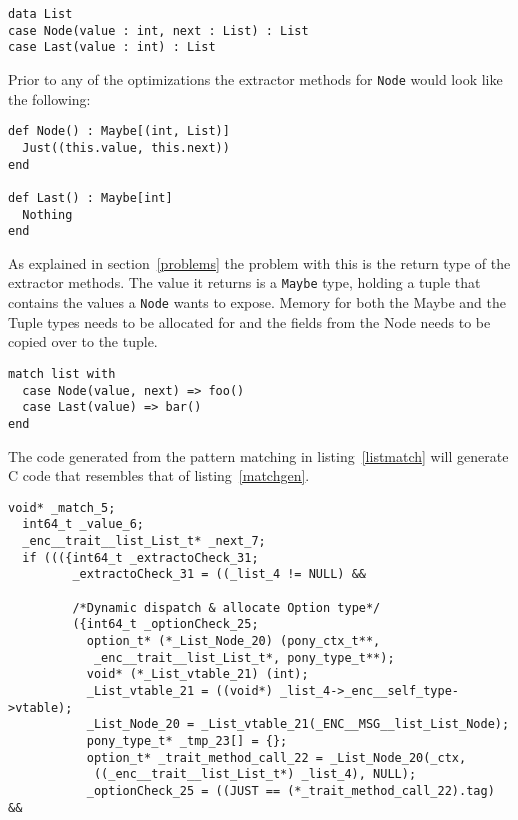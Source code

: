 \documentclass[10pt]{report}
\def\code#1{\texttt{#1}} %
\begin{document}
{\begin{lstlisting}[language=encore]
data List
case Node(value : int, next : List) : List
case Last(value : int) : List
\end{lstlisting}

\par{Prior to any of the optimizations the extractor methods for \code{Node} would look like the following:}

\begin{lstlisting}[language=encore,caption={Extractor methods before optimization}]
def Node() : Maybe[(int, List)]
  Just((this.value, this.next))
end

def Last() : Maybe[int]
  Nothing
end
\end{lstlisting}

\par{As explained in section~\ref{problems} the problem with this is the return type of the extractor methods. The value it returns is a \code{Maybe} type, holding a tuple that contains the values a \code{Node} wants to expose. Memory for both the Maybe and the Tuple types needs to be allocated for and the fields from the Node needs to be copied over to the tuple.}


\begin{lstlisting}[language=encore,caption={Pattern matching on a List},label=listmatch]
match list with
  case Node(value, next) => foo()
  case Last(value) => bar()
end
\end{lstlisting}

\par{The code generated from the pattern matching in listing~\ref{listmatch} will generate C code that resembles that of listing~\ref{matchgen}.}


\begin{lstlisting}[language=encore,caption={Pattern matching on a List},label=matchgen]
   void* _match_5;
  int64_t _value_6;
  _enc__trait__list_List_t* _next_7;
  if ((({int64_t _extractoCheck_31;
         _extractoCheck_31 = ((_list_4 != NULL) &&

         /*Dynamic dispatch & allocate Option type*/
         ({int64_t _optionCheck_25;
           option_t* (*_List_Node_20) (pony_ctx_t**,
            _enc__trait__list_List_t*, pony_type_t**);
           void* (*_List_vtable_21) (int);
           _List_vtable_21 = ((void*) _list_4->_enc__self_type->vtable);
           _List_Node_20 = _List_vtable_21(_ENC__MSG__list_List_Node);
           pony_type_t* _tmp_23[] = {};
           option_t* _trait_method_call_22 = _List_Node_20(_ctx,
            ((_enc__trait__list_List_t*) _list_4), NULL);
           _optionCheck_25 = ((JUST == (*_trait_method_call_22).tag) &&


\end{lstlisting}}
\end{document}
